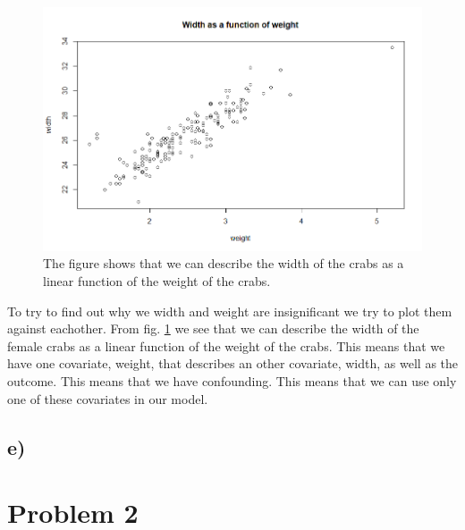 \documentclass[a4paper,norsk, 10pt]{article}
\begin{document}
\begin{figure}
\centering
\includegraphics[scale=0.5]{crabs_width_weight}
\caption{The figure shows that we can describe the width of the crabs as a linear function of the weight of the crabs.}\label{fig:crabs_width_weight}
\end{figure}

To try to find out why we width and weight are insignificant we try to plot them against eachother. From fig. \ref{fig:crabs_width_weight} we see that we can describe the width of the female crabs as a linear function of the weight of the crabs. This means that we have one covariate, weight, that describes an other covariate, width, as well as the outcome. This means that we have confounding. This means that we can use only one of these covariates in our model. 


\subsection{e)}

\section{Problem 2}
\end{document}
